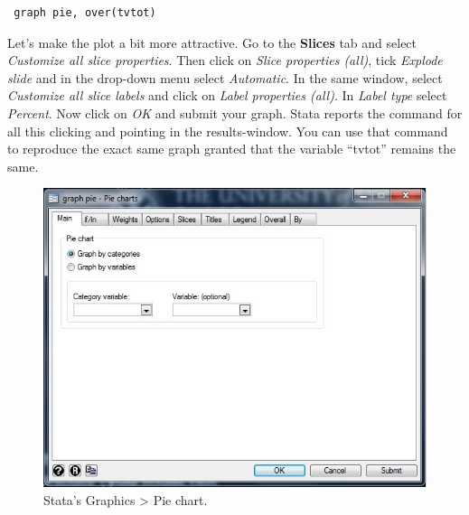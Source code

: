 \documentclass{article}
\begin{document}
\begin{lstlisting}
 graph pie, over(tvtot)
\end{lstlisting}

Let's make the plot a bit more attractive. Go to the \textbf{Slices} tab and select \textit{Customize all slice properties}. Then click on \textit{Slice properties (all)}, tick \textit{Explode slide} and in the drop-down menu select \textit{Automatic}. In the same window, select \textit{Customize all slice labels} and click on \textit{Label properties (all)}. In \textit{Label type} select \textit{Percent}. Now click on \textit{OK} and submit your graph. Stata reports the command for all this clicking and pointing in the results-window. You can use that command to reproduce the exact same graph granted that the variable ``tvtot'' remains the same.

\begin{figure}[H]
	\includegraphics[width=\linewidth]{Graphics_pie.jpg}
	\caption{Stata's Graphics > Pie chart.}
\end{figure}
\end{document}
